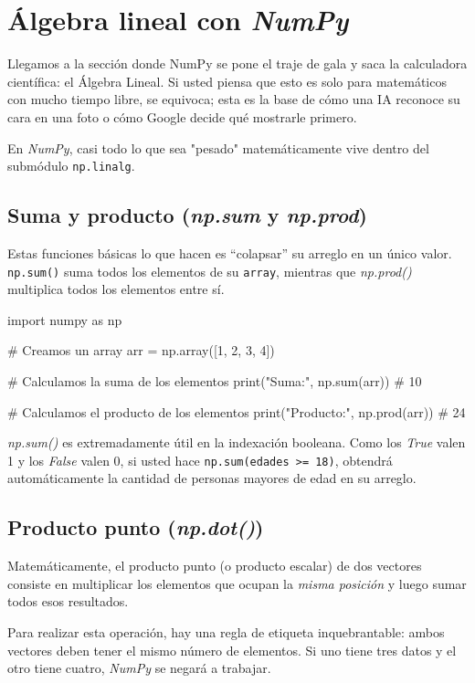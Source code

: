 \section{Álgebra lineal con \textit{NumPy}}

Llegamos a la sección donde NumPy se pone el traje de gala y saca la calculadora científica: el Álgebra Lineal. Si usted piensa que esto es solo para matemáticos con mucho tiempo libre, se equivoca; esta es la base de cómo una IA reconoce su cara en una foto o cómo Google decide qué mostrarle primero.

En \textit{NumPy}, casi todo lo que sea "pesado" matemáticamente vive dentro del submódulo \texttt{np.linalg}.

\subsection{Suma y producto (\textit{np.sum} y \textit{np.prod})}

Estas funciones básicas lo que hacen es ``colapsar'' su arreglo en un único valor. \texttt{np.sum()} suma todos los elementos de su \texttt{array}, mientras que \textit{np.prod()} multiplica todos los elementos entre sí.
\begin{pycode}
import numpy as np

# Creamos un array 
arr = np.array([1, 2, 3, 4])

# Calculamos la suma de los elementos
print("Suma:", np.sum(arr)) # 10

# Calculamos el producto de los elementos
print("Producto:", np.prod(arr)) # 24
\end{pycode}

\begin{nota}
    \textit{np.sum()} es extremadamente útil en la indexación booleana. Como los \textit{True} valen 1 y los \textit{False} valen 0, si usted hace \texttt{np.sum(edades >= 18)}, obtendrá automáticamente la cantidad de personas mayores de edad en su arreglo.
\end{nota}

\subsection{Producto punto (\textit{np.dot()})}

Matemáticamente, el producto punto (o producto escalar) de dos vectores consiste en multiplicar los elementos que ocupan la \textit{misma posición} y luego sumar todos esos resultados.

Para realizar esta operación, hay una regla de etiqueta inquebrantable: ambos vectores deben tener el mismo número de elementos. Si uno tiene tres datos y el otro tiene cuatro, \textit{NumPy} se negará a trabajar.


